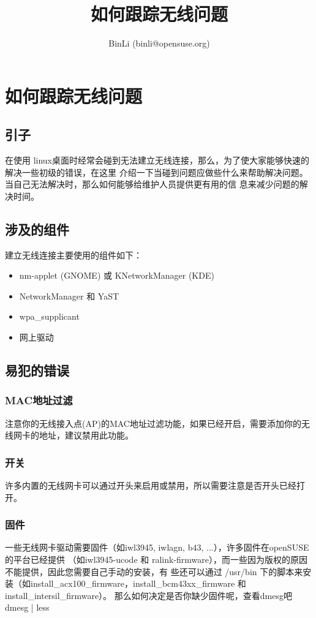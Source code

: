 
\author{BinLi (binli@opensuse.org)}
\title{如何跟踪无线问题}

\maketitle
\tableofcontents
\newpage
\section{如何跟踪无线问题}
\subsection{引子}
在使用 linux桌面时经常会碰到无法建立无线连接，那么，为了使大家能够快速的解决一些初级的错误，在这里
介绍一下当碰到问题应做些什么来帮助解决问题。当自己无法解决时，那么如何能够给维护人员提供更有用的信
息来减少问题的解决时间。
\subsection{涉及的组件}
建立无线连接主要使用的组件如下：
\begin{itemize}
\item nm-applet (GNOME) 或 KNetworkManager (KDE)
\item NetworkManager 和 YaST
\item wpa\_supplicant
\item 网上驱动
\end{itemize}

\subsection{易犯的错误}
\subsubsection{MAC地址过滤}
注意你的无线接入点(AP)的MAC地址过滤功能，如果已经开启，需要添加你的无线网卡的地址，建议禁用此功能。
\subsubsection{开关}
许多内置的无线网卡可以通过开头来启用或禁用，所以需要注意是否开头已经打开。
\subsubsection{固件}
一些无线网卡驱动需要固件（如iwl3945, iwlagn, b43, ...），许多固件在openSUSE的平台已经提供
（如iwl3945-ucode 和 ralink-firmware），而一些因为版权的原因不能提供，因此您需要自己手动的安装，有
些还可以通过 /usr/bin 下的脚本来安装（如install\_acx100\_firmware，install\_bcm43xx\_firmware 和
install\_intersil\_firmware）。
那么如何决定是否你缺少固件呢，查看dmesg吧
dmesg | less
